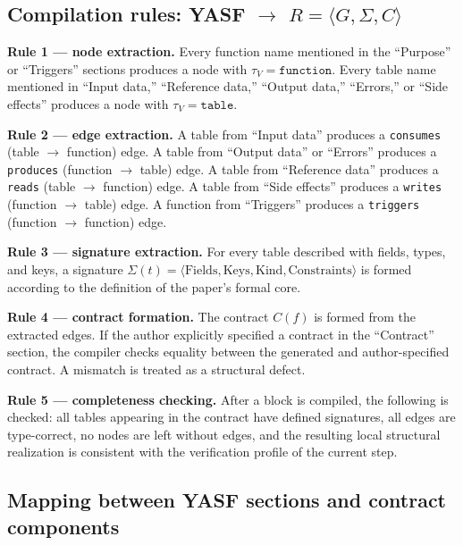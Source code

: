 \subsection{Compilation rules: YASF $\to$ $R = \langle G, \Sigma, C \rangle$}

\textbf{Rule 1 --- node extraction.} Every function name mentioned in the ``Purpose'' or ``Triggers'' sections produces a node with $\tau_V = \texttt{function}$. Every table name mentioned in ``Input data,'' ``Reference data,'' ``Output data,'' ``Errors,'' or ``Side effects'' produces a node with $\tau_V = \texttt{table}$.

\textbf{Rule 2 --- edge extraction.} A table from ``Input data'' produces a \texttt{consumes} (table $\to$ function) edge. A table from ``Output data'' or ``Errors'' produces a \texttt{produces} (function $\to$ table) edge. A table from ``Reference data'' produces a \texttt{reads} (table $\to$ function) edge. A table from ``Side effects'' produces a \texttt{writes} (function $\to$ table) edge. A function from ``Triggers'' produces a \texttt{triggers} (function $\to$ function) edge.

\textbf{Rule 3 --- signature extraction.} For every table described with fields, types, and keys, a signature $\Sigma(t) = \langle \mathrm{Fields}, \mathrm{Keys}, \mathrm{Kind}, \mathrm{Constraints} \rangle$ is formed according to the definition of the paper's formal core.

\textbf{Rule 4 --- contract formation.} The contract $C(f)$ is formed from the extracted edges. If the author explicitly specified a contract in the ``Contract'' section, the compiler checks equality between the generated and author-specified contract. A mismatch is treated as a structural defect.

\textbf{Rule 5 --- completeness checking.} After a block is compiled, the following is checked: all tables appearing in the contract have defined signatures, all edges are type-correct, no nodes are left without edges, and the resulting local structural realization is consistent with the verification profile of the current step.

\subsection{Mapping between YASF sections and contract components}

